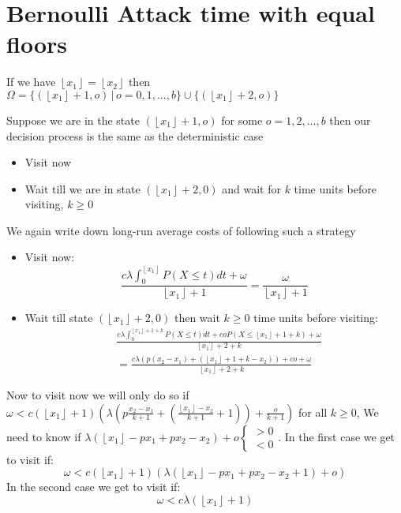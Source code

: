 \documentclass[a4paper,10pt]{article}
\newcommand{\floor}[1]{\left \lfloor #1 \right \rfloor}
\theoremstyle{definition}
\theoremstyle{definition}
\theoremstyle{remark}
\theoremstyle{definition}
\begin{document}
\section{Bernoulli Attack time with equal floors}
\label{Bernoulli Attack time with equal floors}

If we have $\floor{x_{1}}=\floor{x_{2}}$ then $\Omega= \{(\floor{x_{1}}+1,o) \, | \, o=0,1,...,b \} \cup \{(\floor{x_{1}}+2,o) \}$

Suppose we are in the state $(\floor{x_{1}}+1,o)$ for some $o=1,2,...,b$ then our decision process is the same as the deterministic case
\begin{itemize}
\item Visit now
\item Wait till we are in state $(\floor{x_{1}}+2,0)$ and wait for $k$ time units before visiting, $k \geq 0$
\end{itemize}

We again write down long-run average costs of following such a strategy
\begin{itemize}
\item Visit now:
\begin{equation}
\frac{c \lambda \int_{0}^{\floor{x_{1}}} P(X \leq t) dt + \omega}{\floor{x_{1}}+1}=\frac{\omega}{\floor{x_{1}}+1}
\end{equation}
\item Wait till state $(\floor{x_{1}}+2,0)$ then wait $k \geq 0$ time units before visiting:
\begin{align}
&\frac{c \lambda \int_{0}^{\floor{x_{1}}+1+k} P(X \leq t) dt + coP(X \leq \floor{x_{1}}+1+k) +\omega }{\floor{x_{1}}+2+k} \nonumber \\ &=\frac{c \lambda (p(x_{2}-x_{1})+(\floor{x_{1}}+1+k-x_{2})) + co + \omega}{\floor{x_{1}}+2+k}
\end{align}
\end{itemize}

Now to visit now we will only do so if $\omega < c (\floor{x_{1}}+1) (\lambda (p\frac{x_{2}-x_{1}}{k+1}+ (\frac{\floor{x_{1}}-x_{2}}{k+1} +1))+\frac{o}{k+1})$ for all $k \geq 0$, We need to know if $\lambda (\floor{x_{1}}-px_{1}+px_{2}-x_{2})+o \begin{cases}
 >0 \\
 <0
\end{cases}$. 
In the first case we get to visit if:
\begin{equation}
\omega < c(\floor{x_{1}}+1)(\lambda (\floor{x_{1}}-px_{1}+px_{2}-x_{2}+1)+ o)
\end{equation}
In the second case we get to visit if:
\begin{equation}
\omega < c \lambda (\floor{x_{1}}+1)
\end{equation}
\end{document}

